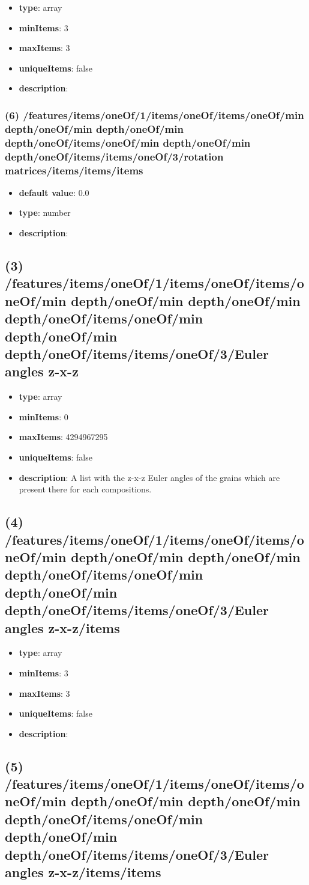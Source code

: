 \begin{itemize}[leftmargin=5em]\item {\bf type}: array
\item {\bf minItems}: 3
\item {\bf maxItems}: 3
\item {\bf uniqueItems}: false
\item {\bf description}: 
\end{itemize}\subsubsection{(6) /features/items/oneOf/1/items/oneOf/items/oneOf/min depth/oneOf/min depth/oneOf/min depth/oneOf/items/oneOf/min depth/oneOf/min depth/oneOf/items/items/oneOf/3/rotation matrices/items/items/items}
\begin{itemize}[leftmargin=6em]\item {\bf default value}: 0.0
\item {\bf type}: number
\item {\bf description}: 
\end{itemize}\subsection{(3) /features/items/oneOf/1/items/oneOf/items/oneOf/min depth/oneOf/min depth/oneOf/min depth/oneOf/items/oneOf/min depth/oneOf/min depth/oneOf/items/items/oneOf/3/Euler angles z-x-z}
\begin{itemize}[leftmargin=3em]\item {\bf type}: array
\item {\bf minItems}: 0
\item {\bf maxItems}: 4294967295
\item {\bf uniqueItems}: false
\item {\bf description}: A list with the z-x-z Euler angles of the grains which are present there for each compositions.
\end{itemize}\subsection{(4) /features/items/oneOf/1/items/oneOf/items/oneOf/min depth/oneOf/min depth/oneOf/min depth/oneOf/items/oneOf/min depth/oneOf/min depth/oneOf/items/items/oneOf/3/Euler angles z-x-z/items}
\begin{itemize}[leftmargin=4em]\item {\bf type}: array
\item {\bf minItems}: 3
\item {\bf maxItems}: 3
\item {\bf uniqueItems}: false
\item {\bf description}: 
\end{itemize}\subsection{(5) /features/items/oneOf/1/items/oneOf/items/oneOf/min depth/oneOf/min depth/oneOf/min depth/oneOf/items/oneOf/min depth/oneOf/min depth/oneOf/items/items/oneOf/3/Euler angles z-x-z/items/items}
